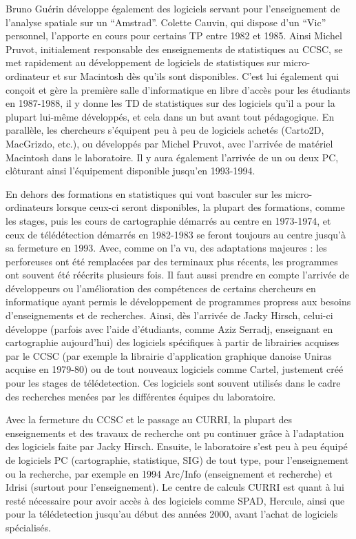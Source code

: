 Bruno Guérin développe également des logiciels servant pour l'enseignement de l'analyse spatiale sur un \enquote{Amstrad}. Colette Cauvin, qui dispose d'un \enquote{Vic} personnel, l'apporte en cours pour certains TP entre 1982 et 1985. Ainsi Michel Pruvot, initialement responsable des enseignements de statistiques au CCSC, se met rapidement au développement de logiciels de statistiques sur micro-ordinateur et sur Macintosh dès qu'ils sont disponibles. C'est lui également qui conçoit et gère la première salle d'informatique en libre d'accès pour les étudiants en 1987-1988, il y donne les TD de statistiques sur des logiciels qu'il a pour la plupart lui-même développés, et cela dans un but avant tout pédagogique. En parallèle, les chercheurs s'équipent peu à peu de logiciels achetés (Carto2D, MacGrizdo, etc.), ou développés par Michel Pruvot, avec l'arrivée de matériel Macintosh dans le laboratoire. Il y aura également l'arrivée de un ou deux PC, clôturant ainsi l'équipement disponible jusqu'en 1993-1994.

En dehors des formations en statistiques qui vont basculer sur les micro-ordinateurs lorsque ceux-ci seront disponibles, la plupart des formations, comme les stages, puis les cours de cartographie démarrés au centre en 1973-1974, et ceux de télédétection démarrés en 1982-1983 se feront toujours au centre jusqu'à sa fermeture en 1993. Avec, comme on l'a vu, des adaptations majeures : les perforeuses ont été remplacées par des terminaux plus récents, les programmes ont souvent été réécrits plusieurs fois. Il faut aussi prendre en compte l'arrivée de développeurs ou l'amélioration des compétences de certains chercheurs en informatique ayant permis le développement de programmes propress aux besoins d'enseignements et de recherches. Ainsi, dès l'arrivée de Jacky Hirsch, celui-ci développe (parfois avec l'aide d'étudiants, comme Aziz Serradj, enseignant en cartographie aujourd'hui) des logiciels spécifiques à partir de librairies acquises par le CCSC (par exemple la librairie d'application graphique danoise Uniras acquise en 1979-80) ou de tout nouveaux logiciels comme Cartel, justement créé pour les stages de télédetection. Ces logiciels sont souvent utilisés dans le cadre des recherches menées par les différentes équipes du laboratoire.

Avec la fermeture du CCSC et le passage au CURRI, la plupart des enseignements et des travaux de recherche ont pu continuer grâce à l'adaptation des logiciels faite par Jacky Hirsch. Ensuite, le laboratoire s'est peu à peu équipé de logiciels PC (cartographie, statistique, SIG) de tout type, pour l'enseignement ou la recherche, par exemple en 1994 Arc/Info (enseignement et recherche) et Idrisi (surtout pour l'enseignement). Le centre de calculs CURRI est quant à lui resté nécessaire pour avoir accès à des logiciels comme SPAD, Hercule, ainsi que pour la télédetection jusqu'au début des années 2000, avant l'achat de logiciels spécialisés.

